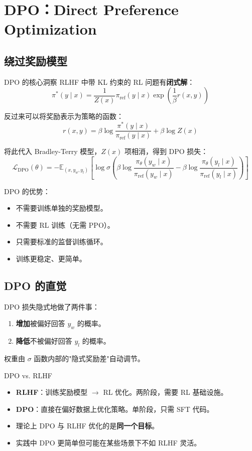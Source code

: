 \section{DPO：Direct Preference Optimization}

\subsection{绕过奖励模型}

\begin{importantbox}{DPO 的核心洞察}
RLHF 中带 KL 约束的 RL 问题有\textbf{闭式解}：
$$\pi^*(y \mid x) = \frac{1}{Z(x)} \pi_{\mathrm{ref}}(y \mid x) \exp\left(\frac{1}{\beta} r(x, y)\right)$$

反过来可以将奖励表示为策略的函数：
$$r(x, y) = \beta \log \frac{\pi^*(y \mid x)}{\pi_{\mathrm{ref}}(y \mid x)} + \beta \log Z(x)$$

将此代入 Bradley-Terry 模型，$Z(x)$ 项相消，得到 DPO 损失：
$$\mathcal{L}_{\mathrm{DPO}}(\theta) = -\mathbb{E}_{(x, y_w, y_l)}\left[\log \sigma\left(\beta \log \frac{\pi_\theta(y_w \mid x)}{\pi_{\mathrm{ref}}(y_w \mid x)} - \beta \log \frac{\pi_\theta(y_l \mid x)}{\pi_{\mathrm{ref}}(y_l \mid x)}\right)\right]$$
\end{importantbox}

DPO 的优势：
\begin{itemize}
    \item 不需要训练单独的奖励模型。
    \item 不需要 RL 训练（无需 PPO）。
    \item 只需要标准的监督训练循环。
    \item 训练更稳定、更简单。
\end{itemize}

\subsection{DPO 的直觉}

DPO 损失隐式地做了两件事：
\begin{enumerate}
    \item \textbf{增加}被偏好回答 $y_w$ 的概率。
    \item \textbf{降低}不被偏好回答 $y_l$ 的概率。
\end{enumerate}

权重由 $\sigma$ 函数内部的"隐式奖励差"自动调节。

\begin{knowledgebox}{DPO vs. RLHF}
\begin{itemize}
    \item \textbf{RLHF}：训练奖励模型 $\to$ RL 优化。两阶段，需要 RL 基础设施。
    \item \textbf{DPO}：直接在偏好数据上优化策略。单阶段，只需 SFT 代码。
    \item 理论上 DPO 与 RLHF 优化的是\textbf{同一个目标}。
    \item 实践中 DPO 更简单但可能在某些场景下不如 RLHF 灵活。
\end{itemize}
\end{knowledgebox}

